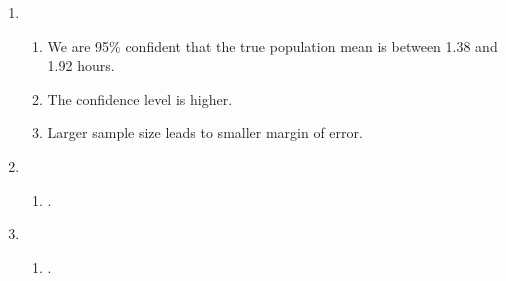 \documentclass[12pt,letterpaper]{article}
\begin{document}
\begin{enumerate}
\item \begin{enumerate}
\item We are 95\% confident that the true population mean is between 1.38 and 1.92 hours.
\item The confidence level is higher.
\item Larger sample size leads to smaller margin of error.
\end{enumerate}

\item \begin{enumerate}
\item .
\end{enumerate}

\item \begin{enumerate}
\item .
\end{enumerate}


\end{enumerate}
\end{document}

